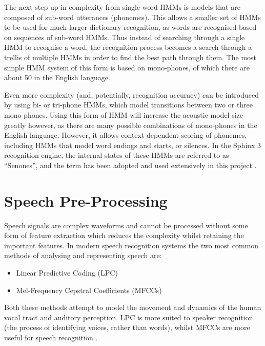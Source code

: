 		The next step up in complexity from single word HMMs is models that are composed of sub-word utterances (phonemes).  This allows a smaller set of HMMs to be used for much larger dictionary recognition, as words are recognised based on sequences of sub-word HMMs.  Thus instead of searching through a single HMM to recognise a word, the recognition process becomes a search through a trellis of multiple HMMs in order to find the best path through them.  The most simple HMM system of this form is based on mono-phones, of which there are about 50 in the English language.

		Even more complexity (and, potentially, recognition accuracy) can be introduced by using bi- or tri-phone HMMs, which model transitions between two or three mono-phones.  Using this form of HMM will increase the acoustic model size greatly however, as there are many possible combinations of mono-phones in the English language.  However, it allows context dependent scoring of phonemes, including HMMs that model word endings and starts, or silences.  In the Sphinx 3 recognition engine, the internal states of these HMMs are referred to as ``Senones'', and the term has been adopted and used extensively in this project \cite{sphinx}.



\section{Speech Pre-Processing} %
\label{sec:speech_pre_processing}
	Speech signals are complex waveforms and cannot be processed without some form of feature extraction which reduces the complexity whilst retaining the important features.  In modern speech recognition systems the two most common methods of analysing and representing speech are: \cite{gaikwad2010review}
	\begin{itemize}
		\item Linear Predictive Coding (LPC)
		\item Mel-Frequency Cepstral Coefficients (MFCCs)
	\end{itemize}
	Both these methods attempt to model the movement and dynamics of the human vocal tract and auditory perception.  LPC is more suited to speaker recognition (the process of identifying voices, rather than words), whilst MFCCs are more useful for speech recognition \cite{sd2012interview}.

